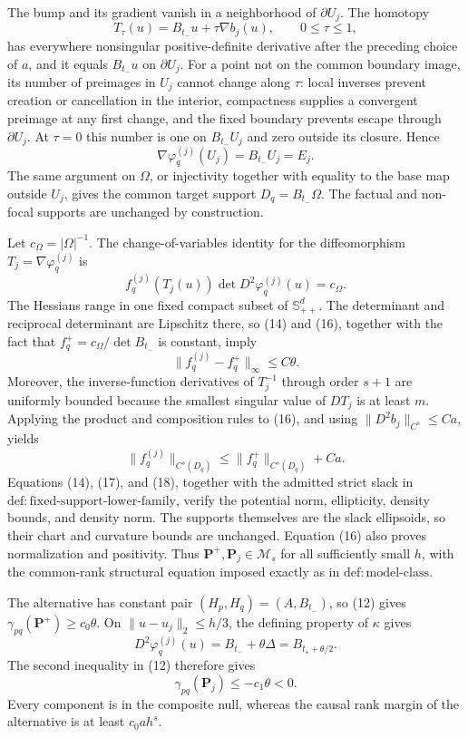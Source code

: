 The bump and its gradient vanish in a neighborhood of \(\partial U_j\).  The homotopy
\[
 T_\tau(u)=B_{t_-}u+\tau\nabla b_j(u),
 \qquad 0\le\tau\le1,
\]
has everywhere nonsingular positive-definite derivative after the preceding choice of \(a\), and it equals \(B_{t_-}u\) on \(\partial U_j\).  For a point not on the common boundary image, its number of preimages in \(U_j\) cannot change along \(\tau\): local inverses prevent creation or cancellation in the interior, compactness supplies a convergent preimage at any first change, and the fixed boundary prevents escape through \(\partial U_j\).  At \(\tau=0\) this number is one on \(B_{t_-}U_j\) and zero outside its closure.  Hence
\[
 \nabla\varphi_q^{(j)}(U_j)=B_{t_-}U_j=E_j.
 \tag{15}
\]
The same argument on \(\Omega\), or injectivity together with equality to the base map outside \(U_j\), gives the common target support \(D_q=B_{t_-}\Omega\).  The factual and non-focal supports are unchanged by construction.

Let \(c_\Omega=\lvert\Omega\rvert^{-1}\).  The change-of-variables identity for the diffeomorphism \(T_j=\nabla\varphi_q^{(j)}\) is
\[
 f_q^{(j)}(T_j(u))\det D^2\varphi_q^{(j)}(u)=c_\Omega.
 \tag{16}
\]
The Hessians range in one fixed compact subset of \(\mathbb S_{++}^d\).  The determinant and reciprocal determinant are Lipschitz there, so (14) and (16), together with the fact that \(f_q^+=c_\Omega/\det B_{t_-}\) is constant, imply
\[
 \lVert f_q^{(j)}-f_q^+\rVert_\infty\le C\theta.
 \tag{17}
\]
Moreover, the inverse-function derivatives of \(T_j^{-1}\) through order \(s+1\) are uniformly bounded because the smallest singular value of \(DT_j\) is at least \(m\).  Applying the product and composition rules to (16), and using \(\lVert D^2b_j\rVert_{C^s}\le Ca\), yields
\[
 \lVert f_q^{(j)}\rVert_{C^s(D_q)}
 \le\lVert f_q^+\rVert_{C^s(D_q)}+Ca.
 \tag{18}
\]
Equations (14), (17), and (18), together with the admitted strict slack in \(\mathrm{def:fixed\text{-}support\text{-}lower\text{-}family}\), verify the potential norm, ellipticity, density bounds, and density norm.  The supports themselves are the slack ellipsoids, so their chart and curvature bounds are unchanged.  Equation (16) also proves normalization and positivity.  Thus \(\mathbf P^+,\mathbf P_j\in\mathcal M_s\) for all sufficiently small \(h\), with the common-rank structural equation imposed exactly as in \(\mathrm{def:model\text{-}class}\).

The alternative has constant pair \((H_p,H_q)=(A,B_{t_-})\), so (12) gives \(\gamma_{pq}(\mathbf P^+)\ge c_0\theta\).  On \(\lVert u-u_j\rVert_2\le h/3\), the defining property of \(\kappa\) gives
\[
 D^2\varphi_q^{(j)}(u)=B_{t_-}+\theta\Delta
 =B_{t_\star+\theta/2}.
\]
The second inequality in (12) therefore gives
\[
 \gamma_{pq}(\mathbf P_j)\le-c_1\theta<0.
 \tag{19}
\]
Every component is in the composite null, whereas the causal rank margin of the alternative is at least \(c_0ah^s\).

